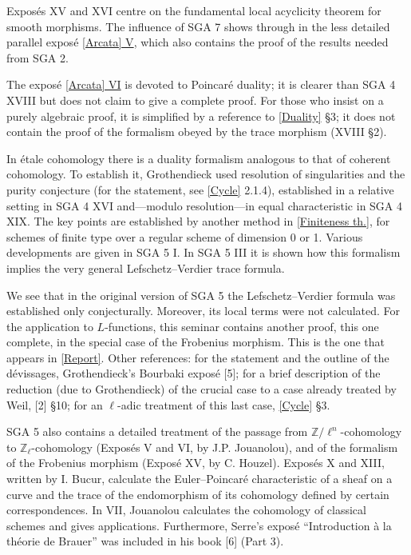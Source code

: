 Exposés XV and XVI centre on the fundamental local acyclicity theorem for
smooth morphisms. The influence of SGA 7 shows through in the less detailed
parallel exposé \hyperref[I:5]{[Arcata] V}, which also contains the proof of
the results needed from SGA 2.

The exposé \hyperref[I:6]{[Arcata] VI} is devoted to Poincaré duality; it is
clearer than SGA 4 XVIII but does not claim to give a complete proof. For those
who insist on a purely algebraic proof, it is simplified by a reference to
\hyperref[V]{[Duality]} §3; it does not contain the proof of the formalism
obeyed by the trace morphism (XVIII §2).

In étale cohomology there is a duality formalism analogous to that of coherent
cohomology. To establish it, Grothendieck used resolution of singularities
and the purity conjecture (for the statement, see \hyperref[IV]{[Cycle]}
2.1.4), established in a relative setting in SGA 4 XVI and---modulo
resolution---in equal characteristic in SGA 4 XIX. The key points are
established by another method in \hyperref[VII]{[Finiteness th.]}, for schemes
of finite type over a regular scheme of dimension 0 or 1. Various developments
are given in SGA 5 I. In SGA 5 III it is shown how this formalism implies the
very general Lefschetz--Verdier trace formula.

We see that in the original version of SGA 5 the Lefschetz--Verdier formula
was established only conjecturally. Moreover, its local terms were not
calculated. For the application to $L$-functions, this seminar contains
another proof, this one complete, in the special case of the Frobenius
morphism. This is the one that appears in \hyperref[II]{[Report]}. Other
references: for the statement and the outline of the dévissages,
Grothendieck's Bourbaki exposé [5]; for a brief description of the reduction
(due to Grothendieck) of the crucial case to a case already treated by Weil,
[2] §10; for an $\ell$-adic treatment of this last case,
\hyperref[IV]{[Cycle]} §3.

SGA 5 also contains a detailed treatment of the passage from
$\mathbb Z/\ell^n$-cohomology to $\mathbb Z_\ell$-cohomology (Exposés V and
VI, by J.P. Jouanolou), and of the formalism of the Frobenius morphism
(Exposé XV, by C. Houzel). Exposés X
and XIII, written by I. Bucur, calculate the Euler--Poincaré characteristic
of a sheaf on a curve and the trace of the endomorphism of its cohomology
defined by certain correspondences. In VII, Jouanolou calculates the
cohomology of classical schemes and gives applications. Furthermore, Serre's
exposé ``Introduction à la théorie de Brauer'' was included in his book [6]
(Part 3).

